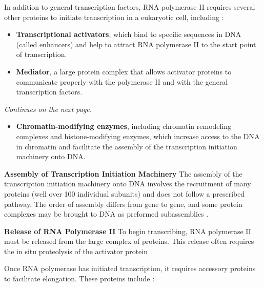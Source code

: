 In addition to general transcription factors, RNA polymerase II requires several other proteins to initiate transcription in a eukaryotic cell, including \cite*{L1-Chapter6}:
\begin{highlight}
    \begin{itemize}
        \item \textbf{Transcriptional activators}, which bind to specific sequences in DNA (called enhancers) and help to attract RNA polymerase II to the start point of transcription.
        \item \textbf{Mediator}, a large protein complex that allows activator proteins to communicate properly with the polymerase II and with the general transcription factors.
    \end{itemize}
\end{highlight}
\textit{Continues on the next page.}
\begin{highlight}
    \begin{itemize}
        \item \textbf{Chromatin-modifying enzymes}, including chromatin remodeling complexes and histone-modifying enzymes, which increase access to the DNA in chromatin and facilitate the assembly of the transcription initiation machinery onto DNA.
    \end{itemize}
\end{highlight}

\textbf{Assembly of Transcription Initiation Machinery}
The assembly of the transcription initiation machinery onto DNA involves the recruitment of many proteins (well over 100 individual subunits) and does not follow a prescribed pathway. The order of assembly differs from gene to gene, and some protein complexes may be brought to DNA as preformed subassemblies \cite*{L1-Chapter6}.

\textbf{Release of RNA Polymerase II}
To begin transcribing, RNA polymerase II must be released from the large complex of proteins. This release often requires the in situ proteolysis of the activator protein \cite*{L1-Chapter6}.

Once RNA polymerase has initiated transcription, it requires accessory proteins to facilitate elongation. These proteins include \cite*{L1-Chapter6}:


